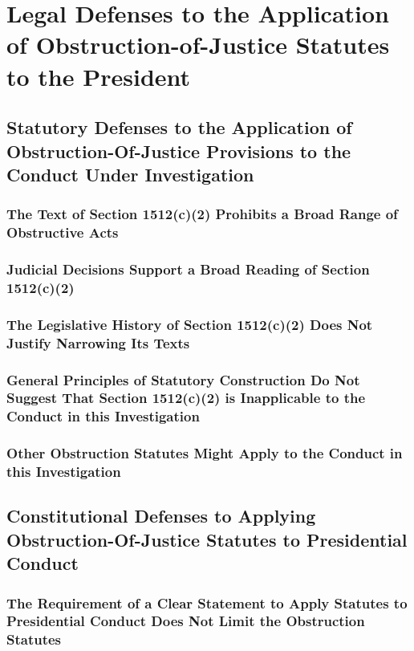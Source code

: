 \section{Legal Defenses to the Application of Obstruction-of-Justice Statutes to the President}

\subsection{Statutory Defenses to the Application of Obstruction-Of-Justice Provisions to the Conduct Under Investigation}

\subsubsection{The Text of Section 1512(c)(2) Prohibits a Broad Range of Obstructive Acts}

\subsubsection{Judicial Decisions Support a Broad Reading of Section 1512(c)(2)}

\subsubsection{The Legislative History of Section 1512(c)(2) Does Not Justify Narrowing Its Texts}

\subsubsection{General Principles of Statutory Construction Do Not Suggest That Section 1512(c)(2) is Inapplicable to the Conduct in this Investigation}

\subsubsection{Other Obstruction Statutes Might Apply to the Conduct in this Investigation}

\subsection{Constitutional Defenses to Applying Obstruction-Of-Justice Statutes to Presidential Conduct}

\subsubsection{The Requirement of a Clear Statement to Apply Statutes to Presidential Conduct Does Not Limit the Obstruction Statutes}

